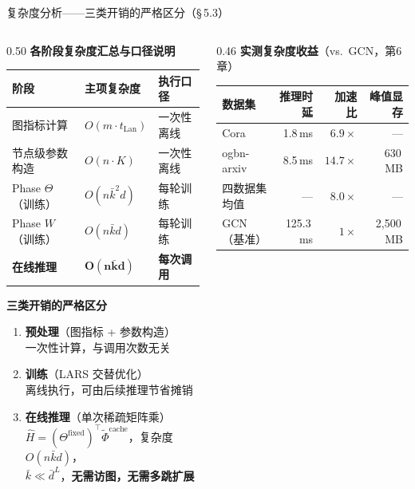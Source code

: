 \documentclass[aspectratio=169,9pt,xcolor=dvipsnames]{beamer}
\newcommand{\highlight}[1]{\textcolor{myred}{\textbf{#1}}}
\newcommand{\blue}[1]{\textcolor{mynavy}{#1}}
\newcommand{\kbar}{\ensuremath{\bar{k}}}
\begin{document}
\begin{frame}{复杂度分析——三类开销的严格区分（§\,5.3）}
\begin{columns}[T]

\begin{column}{0.50\textwidth}
  \textbf{\blue{各阶段复杂度汇总与口径说明}}

  \vspace{0.1cm}
  \begin{tabular}{m{2.3cm}m{1.6cm}m{1.8cm}}
    \toprule
    \textbf{阶段} & \textbf{主项复杂度} & \textbf{执行口径} \\
    \midrule
    图指标计算 & $O(m\cdot t_{\mathrm{Lan}})$ & 一次性离线 \\
    节点级参数构造 & $O(n\cdot K)$ & 一次性离线 \\
    Phase $\Theta$（训练） & $O(n\kbar^2 d)$ & 每轮训练 \\
    Phase $W$（训练） & $O(n\kbar d)$ & 每轮训练 \\
    \textbf{在线推理} & $\boldsymbol{O(n\kbar d)}$ & \textbf{每次调用} \\
    \bottomrule
  \end{tabular}

  \vspace{0.5cm}
  \textbf{三类开销的严格区分}
  \begin{enumerate}\setlength{\itemsep}{4pt}
    \item \highlight{预处理}（图指标 + 参数构造）\\
      一次性计算，与调用次数无关
    \item \highlight{训练}（LARS 交替优化）\\
      离线执行，可由后续推理节省摊销
    \item \highlight{在线推理}（单次稀疏矩阵乘）\\
      $\hat{H}=(\Theta^{\mathrm{fixed}})^\top\tilde{\Phi}^{\mathrm{cache}}$，复杂度 $O(n\kbar d)$，\\
      $\kbar\ll\bar{d}^L$，\textbf{无需访图，无需多跳扩展}
  \end{enumerate}
\end{column}

\begin{column}{0.46\textwidth}
  \textbf{\blue{实测复杂度收益}}（vs.\ GCN，第6章）

  \vspace{0.1cm}
  \begin{tabular}{lrrr}
    \toprule
    数据集 & 推理时延 & 加速比 & 峰值显存 \\
    \midrule
    Cora      & 1.8\,ms  & $6.9\times$  & —      \\
    ogbn-arxiv & 8.5\,ms & \highlight{$14.7\times$} & 630\,MB \\
    四数据集均值 & — & \blue{$8.0\times$} & — \\
    \midrule
    GCN（基准） & 125.3\,ms & $1\times$ & 2,500\,MB \\
    \bottomrule
  \end{tabular}


\end{column}
\end{columns}
\end{frame}
\end{document}
